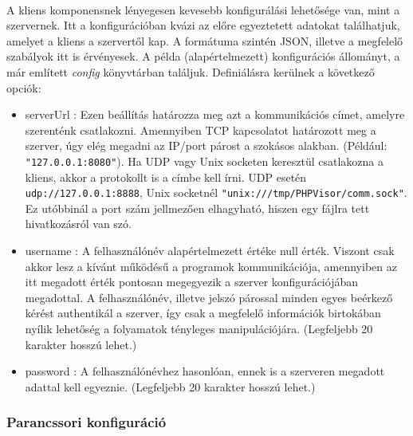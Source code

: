 \documentclass[12pt]{report}
\begin{document}
\paragraph{}
A kliens komponensnek lényegesen kevesebb konfigurálási lehetősége van, mint a szervernek. Itt a konfigurációban kvázi az előre egyeztetett adatokat találhatjuk, amelyet a kliens a szervertől kap. A formátuma szintén JSON, illetve a megfelelő szabályok itt is érvényesek. A példa (alapértelmezett) konfigurációs állományt, a már említett \textit{config} könyvtárban találjuk. Definiálásra kerülnek a következő opciók:
\begin{itemize}
\item serverUrl : Ezen beállítás határozza meg azt a kommunikációs címet, amelyre szerenténk csatlakozni. Amennyiben TCP kapcsolatot határozott meg a szerver, úgy elég megadni az IP/port párost a szokásos alakban. (Például: \verb|"127.0.0.1:8080"|). Ha UDP vagy Unix socketen keresztül csatlakozna a kliens, akkor a protokollt is a címbe kell írni. UDP esetén \verb|udp://127.0.0.1:8888|, Unix socketnél \verb|"unix:///tmp/PHPVisor/comm.sock"|. Ez utóbbinál a port szám jellmezően elhagyható, hiszen egy fájlra tett hivatkozásról van szó.
\item username : A felhasználónév alapértelmezett értéke null érték. Viszont csak akkor lesz  a kívánt működésű  a programok kommunikációja, amennyiben az itt megadott érték pontosan megegyezik a szerver konfigurációjában megadottal. A felhasználónév, illetve jelszó párossal minden egyes beérkező kérést authentikál a szerver, így csak a megfelelő információk birtokában nyílik lehetőség a folyamatok tényleges manipulációjára. (Legfeljebb 20 karakter hosszú lehet.)
\item password : A felhasználónévhez hasonlóan, ennek is a szerveren megadott adattal kell egyeznie. (Legfeljebb 20 karakter hosszú lehet.) 
\end{itemize}

\subsubsection{Parancssori konfiguráció}
\end{document}
